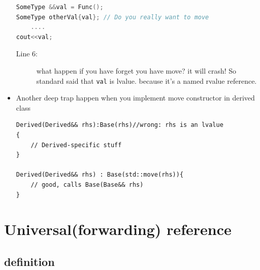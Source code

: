\documentclass[a4paper,11pt,twoside]{book}
\begin{document}
\begin{itemize}
\begin{lstlisting}[frame=single, language=c++]
SomeType &&val = Func();
SomeType otherVal{val}; // Do you really want to move 
	....
cout<<val; 
\end{lstlisting}
\begin{description}
	\item[Line 6:] what happen if you have forget you have move? it will crash! So standard said that \texttt{val} is lvalue. because it's a named rvalue reference.
\end{description}
	
    \item Another deep trap happen when you implement move constructor in derived class
\begin{lstlisting}[numbers=none]
Derived(Derived&& rhs):Base(rhs)//wrong: rhs is an lvalue
{
	// Derived-specific stuff
}
	
Derived(Derived&& rhs) : Base(std::move(rhs)){
	// good, calls Base(Base&& rhs)
}
\end{lstlisting}
	
\end{itemize}



\section{Universal(forwarding) reference }
\subsection{definition}
\end{document}
